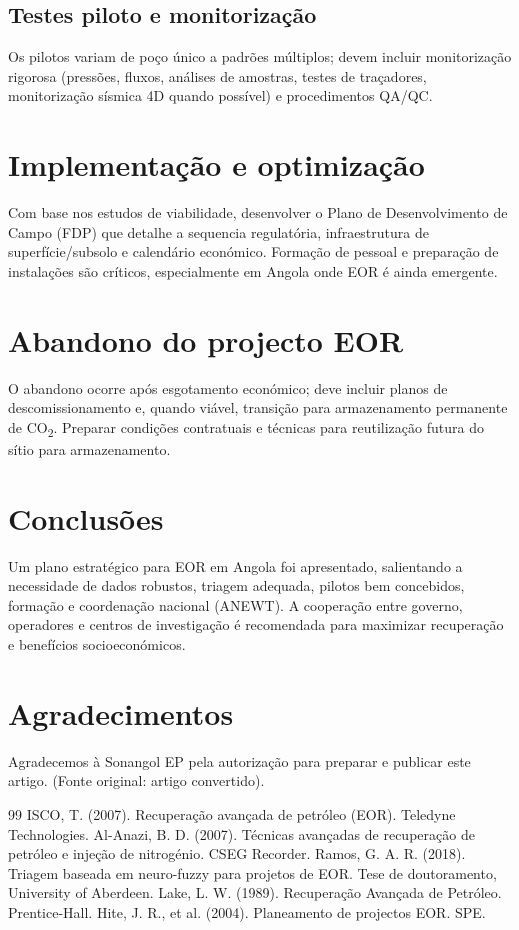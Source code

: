 \documentclass[11pt,a4paper]{article}
\begin{document}
\subsection{Testes piloto e monitorização}
Os pilotos variam de poço único a padrões múltiplos; devem incluir monitorização rigorosa (pressões, fluxos, análises de amostras, testes de traçadores, monitorização sísmica 4D quando possível) e procedimentos QA/QC.

\section{Implementação e optimização}
Com base nos estudos de viabilidade, desenvolver o Plano de Desenvolvimento de Campo (FDP) que detalhe a sequencia regulatória, infraestrutura de superfície/subsolo e calendário económico. Formação de pessoal e preparação de instalações são críticos, especialmente em Angola onde EOR é ainda emergente.

\section{Abandono do projecto EOR}
O abandono ocorre após esgotamento económico; deve incluir planos de descomissionamento e, quando viável, transição para armazenamento permanente de CO\textsubscript{2}. Preparar condições contratuais e técnicas para reutilização futura do sítio para armazenamento.

\section{Conclusões}
Um plano estratégico para EOR em Angola foi apresentado, salientando a necessidade de dados robustos, triagem adequada, pilotos bem concebidos, formação e coordenação nacional (ANEWT). A cooperação entre governo, operadores e centros de investigação é recomendada para maximizar recuperação e benefícios socioeconómicos.

\section*{Agradecimentos}
Agradecemos à Sonangol EP pela autorização para preparar e publicar este artigo. (Fonte original: artigo convertido).

\begin{thebibliography}{99}
 ISCO, T. (2007). Recuperação avançada de petróleo (EOR). Teledyne Technologies.
 Al-Anazi, B. D. (2007). Técnicas avançadas de recuperação de petróleo e injeção de nitrogénio. CSEG Recorder.
 Ramos, G. A. R. (2018). Triagem baseada em neuro-fuzzy para projetos de EOR. Tese de doutoramento, University of Aberdeen.
 Lake, L. W. (1989). Recuperação Avançada de Petróleo. Prentice-Hall.
 Hite, J. R., et al. (2004). Planeamento de projectos EOR. SPE.
\end{thebibliography}
\end{document}
